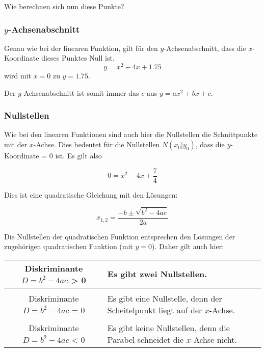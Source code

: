Wie berechnen sich nun diese Punkte?
\newpage


\subsubsection{$y$-Achsenabschnitt}
Genau wie bei der linearen Funktion, gilt für den $y$-Achsenabschnitt,
dass die $x$-Koordinate dieses Punktes Null ist.
$$y = x^2 -4x + 1.75$$
wird mit $x=0$ zu
$y = 1.75$.

Der $y$-Achsenabschnitt ist somit immer das $c$ aus $y = ax^2 + bx +
c$.

\subsubsection{Nullstellen}
Wie bei den linearen Funktionen sind auch hier die
Nullstellen die Schnittpunkte mit der $x$-Achse. Dies bedeutet für die
Nullstellen $N(x_0 | y_0)$, dass die $y$-Koordinate = 0 ist. Es gilt
also

$$0 = x^2 - 4 x + \frac{7}{4} $$

Dies ist eine quadratische Gleichung mit den Lösungen:

$$x_{1,2} = \frac{-b \pm \sqrt{b^2-4ac}}{2a}$$ 


\begin{bemerkung}{}{}
  Die Nullstellen der quadratischen Funktion entsprechen den Lösungen
  der zugehörigen quadratischen Funktion (mit $y=0$). Daher gilt
  auch hier: 


  \begin{tabular}{c|p{8cm}}
    Diskriminante $D=b^2-4ac$ > 0 & Es gibt zwei Nullstellen. \\
    \hline\\
    Diskriminante $D=b^2-4ac$ = 0 & Es gibt eine Nullstelle, denn der Scheitelpunkt liegt auf der $x$-Achse.\\
    \hline\\
    Diskriminante $D=b^2-4ac$ < 0 & Es gibt keine Nullstellen, denn die Parabel schneidet die $x$-Achse nicht.\\
  \end{tabular}
  
 \fi{} 
\end{bemerkung}
\newpage



